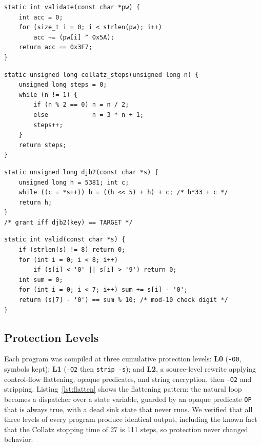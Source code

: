 \documentclass[conference]{IEEEtran}
\begin{document}
\begin{lstlisting}[style=ccode,caption={P1 license validator (unprotected).},label={lst:p1}]
static int validate(const char *pw) {
    int acc = 0;
    for (size_t i = 0; i < strlen(pw); i++)
        acc += (pw[i] ^ 0x5A);
    return acc == 0x3F7;
}
\end{lstlisting}

\begin{lstlisting}[style=ccode,caption={P2 Collatz stopping time (unprotected).},label={lst:p2}]
static unsigned long collatz_steps(unsigned long n) {
    unsigned long steps = 0;
    while (n != 1) {
        if (n % 2 == 0) n = n / 2;
        else            n = 3 * n + 1;
        steps++;
    }
    return steps;
}
\end{lstlisting}

\begin{lstlisting}[style=ccode,caption={P3 djb2 hash key check (unprotected).},label={lst:p3}]
static unsigned long djb2(const char *s) {
    unsigned long h = 5381; int c;
    while ((c = *s++)) h = ((h << 5) + h) + c; /* h*33 + c */
    return h;
}
/* grant iff djb2(key) == TARGET */
\end{lstlisting}

\begin{lstlisting}[style=ccode,caption={P4 serial validator (unprotected, abridged).},label={lst:p4}]
static int valid(const char *s) {
    if (strlen(s) != 8) return 0;
    for (int i = 0; i < 8; i++)
        if (s[i] < '0' || s[i] > '9') return 0;
    int sum = 0;
    for (int i = 0; i < 7; i++) sum += s[i] - '0';
    return (s[7] - '0') == sum % 10; /* mod-10 check digit */
}
\end{lstlisting}

\subsection{Protection Levels}
Each program was compiled at three cumulative protection levels: \textbf{L0}
(\texttt{-O0}, symbols kept); \textbf{L1} (\texttt{-O2} then \texttt{strip -s}); and
\textbf{L2}, a source-level rewrite applying control-flow flattening, opaque
predicates, and string encryption, then \texttt{-O2} and stripping.
Listing~\ref{lst:flatten} shows the flattening pattern: the natural loop becomes a
dispatcher over a state variable, guarded by an opaque predicate \texttt{OP} that is
always true, with a dead sink state that never runs. We verified that all three
levels of every program produce identical output, including the known fact that the
Collatz stopping time of 27 is 111 steps, so protection never changed behavior.
\end{document}

